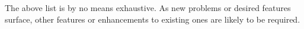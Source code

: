 \par The above list is by no means exhaustive. As new problems or desired features surface, other features or enhancements to existing ones are likely to be required. 



